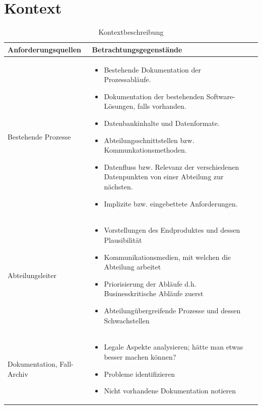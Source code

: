 \section{Kontext}

\begin{table}
  \caption{Kontextbeschreibung}
  \begin{tabular}{| l | l | l|}
    \hline
    \textbf{Anforderungsquellen} & \textbf{Betrachtungsgegenstände} \\ \hline
    Bestehende Prozesse
    &
    {\parbox{0.7\textwidth}{
      \begin{itemize}
        \item Bestehende Dokumentation der Prozessabläufe.
        \item Dokumentation der bestehenden Software-Lösungen, falls vorhanden.
        \item Datenbankinhalte und Datenformate.
        \item Abteilungsschnittstellen bzw. Kommunkationsmethoden.
        \item Datenfluss bzw. Relevanz der verschiedenen Datenpunkten von einer Abteilung zur nächsten.
        \item Implizite bzw. eingebettete Anforderungen.
      \end{itemize}
    }}
    \\ \hline
    Abteilungsleiter
    &
    {\parbox{0.7\textwidth}{
      \begin{itemize}
        \item Vorstellungen des Endproduktes und dessen Plausibilität 
        \item Kommunikationsmedien, mit welchen die Abteilung arbeitet
        \item Priorisierung der Abläufe d.h. Businesskritische Abläufe zuerst
        \item Abteilungübergreifende Prozesse und dessen Schwachstellen
      \end{itemize}
    }}
    \\ \hline    
    Dokumentation, Fall-Archiv
    &
    {\parbox{0.7\textwidth}{
      \begin{itemize}
        \item Legale Aspekte analysieren; hätte man etwas besser machen können? 
        \item Probleme identifizieren
        \item Nicht vorhandene Dokumentation notieren
      \end{itemize}
    }}
    \\ \hline      
  \end{tabular}
\end{table}

